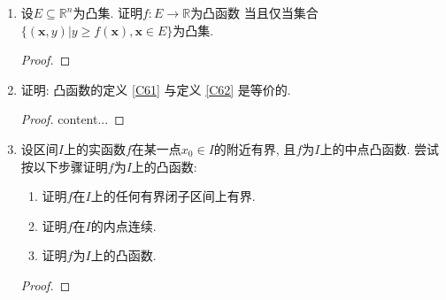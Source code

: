 \begin{3a}
\begin{enumerate}
\item 设\(E\subseteq\mathbb{R}^n\)为凸集. 证明\(f: E\rightarrow\mathbb{R}\)为凸函数
当且仅当集合\(\{(\boldsymbol{x},y)\big|y\geqslant f(\boldsymbol{x}),\boldsymbol{x}\in E\}\)为凸集.
\begin{proof}

\end{proof}
\item 证明: 凸函数的定义 \ref{C61} 与定义 \ref{C62} 是等价的.
\begin{proof}
content...
\end{proof}
\item 设区间\(I\)上的实函数\(f\)在某一点\(x_0\in I\)的附近有界, 
且\(f\)为\(I\)上的中点凸函数. 尝试按以下步骤证明\(f\)为\(I\)上的凸函数:
\begin{enumerate}[label=(\arabic*)]
\item 证明\(f\)在\(I\)上的任何有界闭子区间上有界.
\item 证明\(f\)在\(I\)的内点连续.
\item 证明\(f\)为\(I\)上的凸函数.
\end{enumerate}
\begin{proof}


\end{proof}
\end{enumerate}
\end{3a}
